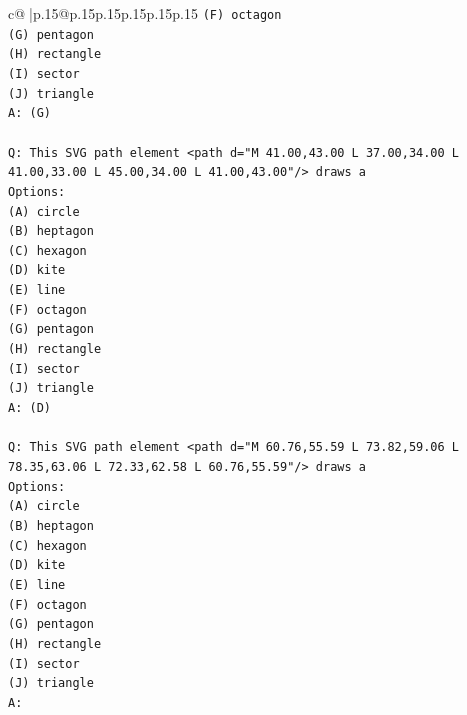 \documentclass{article}
\begin{document}
{\begin{supertabular}{c@{$\;$}|p{.15\linewidth}@{}p{.15\linewidth}p{.15\linewidth}p{.15\linewidth}p{.15\linewidth}p{.15\linewidth}}
{{{\texttt{(F) octagon} \\
\texttt{(G) pentagon} \\
\texttt{(H) rectangle} \\
\texttt{(I) sector} \\
\texttt{(J) triangle} \\
\texttt{A: (G)} \\
\\ 
\texttt{Q: This SVG path element <path d="M 41.00,43.00 L 37.00,34.00 L 41.00,33.00 L 45.00,34.00 L 41.00,43.00"/> draws a} \\
\texttt{Options:} \\
\texttt{(A) circle} \\
\texttt{(B) heptagon} \\
\texttt{(C) hexagon} \\
\texttt{(D) kite} \\
\texttt{(E) line} \\
\texttt{(F) octagon} \\
\texttt{(G) pentagon} \\
\texttt{(H) rectangle} \\
\texttt{(I) sector} \\
\texttt{(J) triangle} \\
\texttt{A: (D)} \\
\\ 
\texttt{Q: This SVG path element <path d="M 60.76,55.59 L 73.82,59.06 L 78.35,63.06 L 72.33,62.58 L 60.76,55.59"/> draws a} \\
\texttt{Options:} \\
\texttt{(A) circle} \\
\texttt{(B) heptagon} \\
\texttt{(C) hexagon} \\
\texttt{(D) kite} \\
\texttt{(E) line} \\
\texttt{(F) octagon} \\
\texttt{(G) pentagon} \\
\texttt{(H) rectangle} \\
\texttt{(I) sector} \\
\texttt{(J) triangle} \\
\texttt{A:} \\
            }
        }
    }
     \\ \\


\end{supertabular}}
\end{document}
